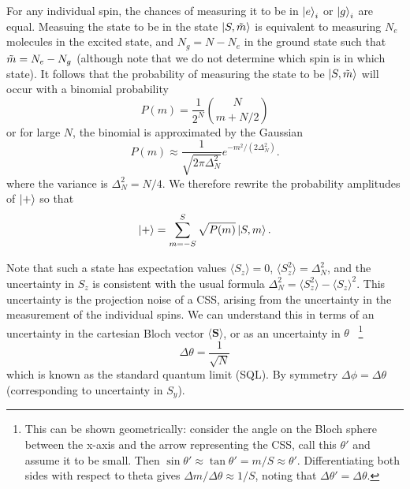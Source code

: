 For any individual spin, the chances of measuring it to be in $\ket{e}_i$ or
$\ket{g}_i$ are equal. Measuing the state to be in the state $\ket{S, \tilde{m}}$
is equivalent to measuring $N_e$ molecules in the excited state, and $N_g = N -
N_e$ in the ground state such that $\tilde{m} = N_e - N_g$ (although note that
we do not determine which spin is in which state). It follows that the
probability of measuring the state to be $\ket{S,\tilde{m}}$ will occur with a
binomial probability~\cite{Gazeau2009}
%
\begin{equation}
  P(m) = \frac{1}{2^N} \binom{N}{m+N/2}
\end{equation}
%
or for large $N$, the binomial is approximated by the Gaussian
%
\begin{equation}
  P(m) \approx\frac{1}{\sqrt{2\pi \Delta_N^2}} e^{-m^2/(2\Delta_N^2)}.
  \label{eqn:CSSmprob}
\end{equation}
%
where the variance is $\Delta_N^2 = N/4$. We therefore rewrite the probability
amplitudes of $\ket{+}$ so that
%
\begin{equation}
  \ket{+} = \sum_{m=-S}^S \sqrt{P(m)}\ket{S,m}.
  \label{squeeze:eqn:plusdicke}
\end{equation}

Note that such a state has expectation values $\langle S_z \rangle = 0$,
$\langle S_z^2\rangle = \Delta_N^2$, and the uncertainty in $S_z$ is consistent
with the usual formula $\Delta_N^2 = \langle S_z^2 \rangle - \langle
S_z\rangle^2$. This uncertainty is the projection noise of a CSS, arising from
the uncertainty in the measurement of the individual spins. We can understand
this in terms of an uncertainty in the cartesian Bloch vector $\langle
\mathbf{S} \rangle$, or as an uncertainty in $\theta$~\cite{PhysRevA.47.3554}
%
\footnote{This can be shown geometrically: consider the angle on the Bloch
sphere between the x-axis and the arrow representing the CSS, call this
$\theta'$ and assume it to be small. Then $\sin
\theta' \approx \tan \theta' = m/S \approx \theta'$. Differentiating both sides
with respect to theta gives $\Delta m / \Delta \theta \approx 1/S$, noting that
$\Delta \theta' = \Delta \theta$.
}
%
\begin{equation}
  \Delta\theta = \frac{1}{\sqrt{N}}
\end{equation}
which is known as the standard quantum limit (SQL). By symmetry $\Delta \phi =
\Delta \theta$ (corresponding to uncertainty in $S_y$).
%

